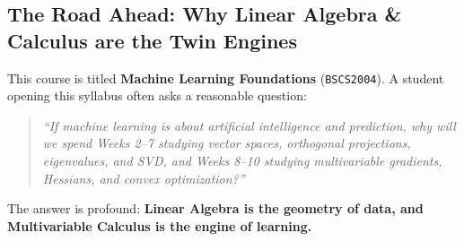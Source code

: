 \subsection{The Road Ahead: Why Linear Algebra \& Calculus are the Twin Engines}
This course is titled \textbf{Machine Learning Foundations} (\texttt{BSCS2004}). A student opening this syllabus often asks a reasonable question:
\begin{quote}
\emph{``If machine learning is about artificial intelligence and prediction, why will we spend Weeks 2--7 studying vector spaces, orthogonal projections, eigenvalues, and SVD, and Weeks 8--10 studying multivariable gradients, Hessians, and convex optimization?''}
\end{quote}
The answer is profound: \textbf{Linear Algebra is the geometry of data, and Multivariable Calculus is the engine of learning.}

